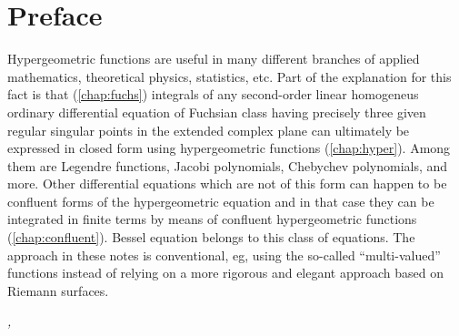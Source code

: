 \chapter*{\protect{} Preface}


Hypergeometric functions  are useful in many different branches of applied
mathematics, theoretical physics, statistics, etc.  Part of the  explanation for
this fact is that (\cref{chap:fuchs}) integrals of any
second-order linear homogeneus ordinary differential equation of Fuchsian class
having precisely three given regular singular points in the extended complex
plane can ultimately be expressed in closed form using hypergeometric
functions (\cref{chap:hyper}). Among them are Legendre
functions, Jacobi polynomials, Chebychev polynomials, and more.  Other differential
equations which are not of this form can happen to 
be confluent forms of the hypergeometric equation and in that case
they can be integrated in finite terms by means of confluent hypergeometric
functions (\cref{chap:confluent}). Bessel equation belongs to this class of
equations. The approach in these notes is conventional, eg, using the so-called ``multi-valued'' functions instead of relying on a more rigorous and elegant approach based on Riemann surfaces.

\smallskip

\noindent\textit{\myLocation, \myTime}


\begin{flushright}
        \myName
\end{flushright}

